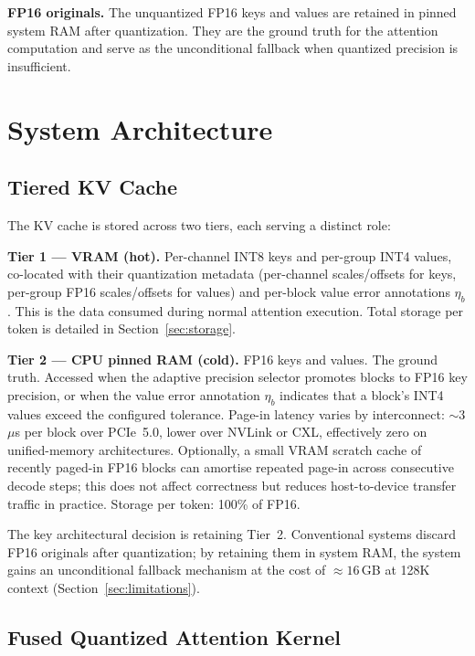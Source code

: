 \documentclass[10pt,twocolumn,a4paper]{article}
\theoremstyle{definition}
\theoremstyle{remark}
\begin{document}
\textbf{FP16 originals.}  The unquantized FP16 keys and values are retained in pinned system RAM after quantization.  They are the ground truth for the attention computation and serve as the unconditional fallback when quantized precision is insufficient.


\section{System Architecture}
\label{sec:arch}

\subsection{Tiered KV Cache}
\label{sec:tiered}

The KV cache is stored across two tiers, each serving a distinct role:

\textbf{Tier 1 --- VRAM (hot).}  Per-channel INT8 keys and per-group INT4 values, co-located with their quantization metadata (per-channel scales/offsets for keys, per-group FP16 scales/offsets for values) and per-block value error annotations $\eta_b$.  This is the data consumed during normal attention execution.  Total storage per token is detailed in Section~\ref{sec:storage}.

\textbf{Tier 2 --- CPU pinned RAM (cold).}  FP16 keys and values.  The ground truth.  Accessed when the adaptive precision selector promotes blocks to FP16 key precision, or when the value error annotation $\eta_b$ indicates that a block's INT4 values exceed the configured tolerance.  Page-in latency varies by interconnect: ${\sim}3$\,$\mu$s per block over PCIe~5.0, lower over NVLink or CXL, effectively zero on unified-memory architectures.  Optionally, a small VRAM scratch cache of recently paged-in FP16 blocks can amortise repeated page-in across consecutive decode steps; this does not affect correctness but reduces host-to-device transfer traffic in practice.  Storage per token: 100\% of FP16.

The key architectural decision is retaining Tier~2.  Conventional systems discard FP16 originals after quantization; by retaining them in system RAM, the system gains an unconditional fallback mechanism at the cost of $\approx 16$\,GB at 128K context (Section~\ref{sec:limitations}).

\subsection{Fused Quantized Attention Kernel}
\label{sec:kernel}
\end{document}

